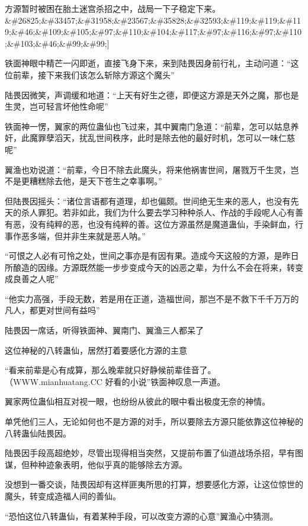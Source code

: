 
\begin{this_body}

方源暂时被困在胎土迷宫杀招之中，战局一下子稳定下来。\&\#26825;\&\#33457;\&\#31958;\&\#23567;\&\#35828;\&\#32593;\&\#119;\&\#119;\&\#119;\&\#46;\&\#109;\&\#105;\&\#97;\&\#110;\&\#104;\&\#117;\&\#97;\&\#116;\&\#97;\&\#110;\&\#103;\&\#46;\&\#99;\&\#99;]

铁面神眼中精芒一闪即逝，直接飞身下来，来到陆畏因身前行礼，主动问道：“这位前辈，接下来我们该怎么斩除方源这个魔头”

陆畏因微笑，声调缓和地道：“上天有好生之德，即便这方源是天外之魔，那也是生灵，岂可轻言坏他性命呢”

铁面神一愣，翼家的两位蛊仙也飞过来，其中翼南门急道：“前辈，怎可以姑息养奸，此魔罪孽滔天，扰乱世间秩序，此时是除去他的最好时机，怎可以一味仁慈呢”

翼渔也劝说道：“前辈，今日不除去此魔头，将来他祸害世间，屠戮万千生灵，岂不是更糟糕除去他，是天下苍生之幸事啊。”

但陆畏因摇头：“诸位言语都有道理，却也偏颇。世间绝无生来的恶人，也没有先天的杀人罪犯。若非如此，我们为什么要去学习种种杀人、作战的手段呢人心有善有恶，没有纯粹的恶，也没有纯粹的善。这位方源虽然是魔道蛊仙，手染鲜血，行事作恶多端，但并非生来就是恶人呐。”

“可恨之人必有可怜之处，世间之事亦是有因有果。造成今天这般的方源，是昨日所酿造的因缘。方源既然能一步步变成今天的凶恶之辈，为什么不会在将来，转变成良善之人呢”

“他实力高强，手段无数，若是用在正道，造福世间，那岂不是不救下千千万万的凡人，都更对世间有益吗”

陆畏因一席话，听得铁面神、翼南门、翼渔三人都呆了

这位神秘的八转蛊仙，居然打着要感化方源的主意

“看来前辈是心有成算，那么晚辈就只好静候前辈佳音了。（WWW.mianhuatang.CC 好看的小说”铁面神叹息一声道。

翼家两位蛊仙相互对视一眼，也纷纷从彼此的眼中看出极度无奈的神情。

单凭他们三人，无论如何也不是方源的对手，所以要除去方源只能依靠这位神秘的八转蛊仙陆畏因。

陆畏因手段高超绝妙，尽管出现得相当突然，又提前布置了仙道战场杀招，早有图谋，但种种迹象表明，他似乎真的能够除去方源。

没想到一番交谈，陆畏因却有这样匪夷所思的打算，想要感化方源，让这位惊世的魔头，转变成造福人间的善仙。

“恐怕这位八转蛊仙，有着某种手段，可以改变方源的心意”翼渔心中猜测。


\end{this_body}
